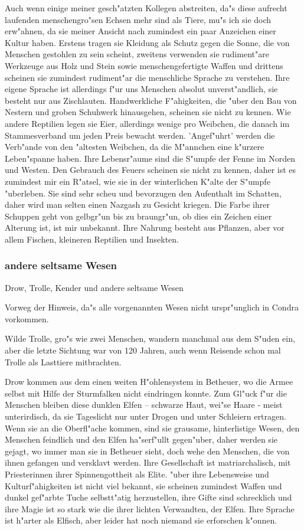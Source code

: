 \documentclass[a5paper,8pt]{book}
\begin{document}
Auch wenn einige meiner gesch"atzten Kollegen abstreiten, da"s diese aufrecht laufenden menschengro"sen Echsen mehr sind als Tiere, mu"s ich sie doch erw"ahnen, da sie meiner Ansicht nach zumindest ein paar Anzeichen einer Kultur haben. Erstens tragen sie Kleidung als Schutz gegen die Sonne, die von Menschen gestohlen zu sein scheint, zweitens verwenden sie rudiment"are Werkzeuge aus Holz und Stein sowie menschengefertigte Waffen und drittens scheinen sie zumindest rudiment"ar die menschliche Sprache zu verstehen. Ihre eigene Sprache ist allerdings f"ur uns Menschen absolut unverst"andlich, sie besteht nur aus Zischlauten. Handwerkliche F"ahigkeiten, die "uber den Bau von Nestern und groben Schuhwerk hinausgehen, scheinen sie nicht zu kennen. Wie andere Reptilien legen sie Eier, allerdings wenige pro Weibchen, die danach im Stammesverband um jeden Preis bewacht werden. 'Angef"uhrt' werden die Verb"ande von den "altesten Weibchen, da die M"annchen eine k"urzere Leben"spanne haben. Ihre Lebensr"aume 
sind die S"umpfe der Fenne im Norden und Westen. Den Gebrauch des Feuers scheinen sie nicht zu kennen, daher ist es zumindest mir ein R"atsel, wie sie in der winterlichen K"alte der S"umpfe "uberleben. Sie sind sehr scheu und bevorzugen den Aufenthalt im Schatten, daher wird man selten einen Nazgash zu Gesicht kriegen. Die Farbe ihrer Schuppen geht von gelbgr"un bis zu braungr"un, ob dies ein Zeichen einer Alterung ist, ist mir unbekannt. Ihre Nahrung besteht aus Pflanzen, aber vor allem Fischen, kleineren Reptilien und Insekten. 

\newpage

\subsubsection{andere seltsame Wesen}

Drow, Trolle, Kender und andere seltsame Wesen

Vorweg der Hinweis, da"s alle vorgenannten Wesen nicht urspr"unglich in Condra vorkommen. 

Wilde Trolle, gro"s wie zwei Menschen, wandern manchmal aus dem S"uden ein, aber die letzte Sichtung war von 120 Jahren, auch wenn Reisende schon mal Trolle als Lasttiere mitbrachten. 

Drow kommen aus dem einen weiten H"ohlensystem in Betheuer, wo die Armee selbst mit Hilfe der Sturmfalken nicht eindringen konnte. Zum Gl"uck f"ur die Menschen bleiben diese dunklen Elfen – schwarze Haut, wei"se Haare - meist unterirdisch, da sie Tageslicht nur unter Drogen und unter Schleiern ertragen. Wenn sie an die Oberfl"ache kommen, sind sie grausame, hinterlistige Wesen, den Menschen feindlich und den Elfen ha"serf"ullt gegen"uber, daher werden sie gejagt, wo immer man sie in Betheuer sieht, doch wehe den Menschen, die von ihnen gefangen und versklavt werden. Ihre Gesellschaft ist matriarchalisch, mit Priesterinnen ihrer Spinnengottheit als Elite. "uber ihre Lebensweise und Kulturf"ahigkeiten ist nicht viel bekannt, sie scheinen zumindest Waffen und dunkel gef"arbte Tuche selbstt"atig herzustellen, ihre Gifte sind schrecklich und ihre Magie ist so stark wie die ihrer lichten Verwandten, der Elfen. Ihre Sprache ist h"arter als Elfisch, aber leider hat noch niemand sie erforschen k"onnen. 
\end{document}
